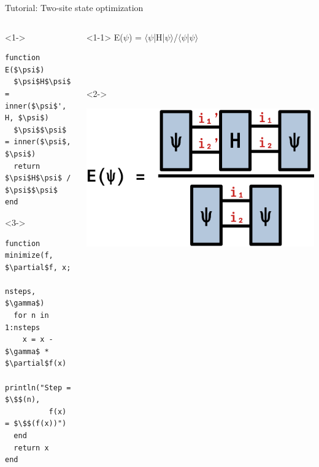 \begin{frame}[fragile]{Tutorial: Two-site state optimization}

\begin{columns}

\begin{column}{5cm}

\begin{onlyenv}<1->
\begin{lstlisting}[language=JuliaLocal, style=julia, mathescape, basicstyle=\scriptsize\ttfamily]
function E($\psi$)
  $\psi$H$\psi$ = inner($\psi$', H, $\psi$)
  $\psi$$\psi$ = inner($\psi$, $\psi$)
  return $\psi$H$\psi$ / $\psi$$\psi$
end
\end{lstlisting}
\end{onlyenv}

\begin{onlyenv}<3->
\begin{lstlisting}[language=JuliaLocal, style=julia, mathescape, basicstyle=\scriptsize\ttfamily]
function minimize(f, $\partial$f, x;
                  nsteps, $\gamma$)
  for n in 1:nsteps
    x = x - $\gamma$ * $\partial$f(x)
    println("Step = $\$$(n),
          f(x) = $\$$(f(x))")
  end
  return x
end
\end{lstlisting}
\end{onlyenv}

\end{column}

\begin{column}{5cm}

\begin{onlyenv}<1-1>
E($\psi$) = $\langle$$\psi$|H|$\psi$$\rangle$/$\langle$$\psi$|$\psi$$\rangle$
~\\
~\\
~\\
~\\
\end{onlyenv}

\begin{onlyenv}<2->
\vspace*{0.0cm}
\begin{center}
\includegraphics[width=1.0\textwidth]{
  slides/assets/psi12Hpsi12.png
}
\end{center}
\vspace*{0.0cm}
\end{onlyenv}


\end{column}
\end{columns}
\end{frame}
